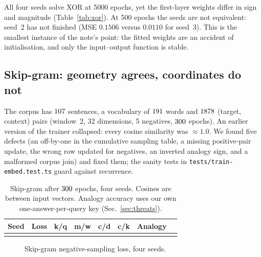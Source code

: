 \documentclass[conference]{IEEEtran}
\begin{document}
All four seeds solve XOR at 5000 epochs, yet the first-layer weights differ in sign and magnitude (Table~\ref{tab:xor}). At 500 epochs the seeds are not equivalent: seed~2 has not finished (MSE $0.1506$ versus $0.0110$ for seed~3). This is the smallest instance of the note's point: the fitted weights are an accident of initialisation, and only the input--output function is stable.

\subsection{Skip-gram: geometry agrees, coordinates do not}
The corpus has $107$ sentences, a vocabulary of $191$ words and $1878$ (target, context) pairs (window~2, 32 dimensions, 5 negatives, $300$ epochs). An earlier version of the trainer collapsed: every cosine similarity was $\approx 1.0$. We found five defects (an off-by-one in the cumulative sampling table, a missing positive-pair update, the wrong row updated for negatives, an inverted analogy sign, and a malformed corpus join) and fixed them; the sanity tests in \texttt{tests/train-embed.test.ts} guard against recurrence.

\begin{table}[t]
\caption{Skip-gram after $300$ epochs, four seeds. Cosines are between input vectors. Analogy accuracy uses our own one-answer-per-query key (Sec.~\ref{sec:threats}).}
\label{tab:sg}
\centering\footnotesize
\setlength{\tabcolsep}{3pt}
\begin{tabular}{@{}lccccccc@{}}
\toprule
Seed & Loss & k/q & m/w & c/d & c/k & Analogy \\
\midrule
\\
\bottomrule
\end{tabular}
\end{table}

\begin{figure}[t]
\centering
{}
\caption{Skip-gram negative-sampling loss, four seeds.}
\label{fig:sgloss}
\end{figure}
\end{document}

